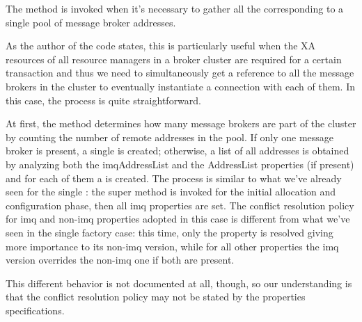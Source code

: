 The  method is invoked when it's necessary to gather all the  corresponding to a single pool of message broker addresses.

As the author of the code states, this is particularly useful when the XA resources of all resource managers in a broker cluster are required for a certain transaction and thus we need to simultaneously get a reference to all the message brokers in the cluster to eventually instantiate a connection with each of them. In this case, the process is quite straightforward.

At first, the method determines how many message brokers are part of the cluster by counting the number of remote addresses in the pool. If only one message broker is present, a single  is created; otherwise, a list of all addresses is obtained by analyzing both the imqAddressList and the AddressList properties (if present) and for each of them a  is created. The process is similar to what we've already seen for the single : the super method is invoked for the initial allocation and configuration phase, then all imq properties are set. The conflict resolution policy for imq and non-imq properties adopted in this case is different from what we've seen in the single factory case: this time, only the  property is resolved giving more importance to its non-imq version, while for all other properties the imq version overrides the non-imq one if both are present.

This different behavior is not documented at all, though, so our understanding is that the conflict resolution policy may not be stated by the properties specifications.